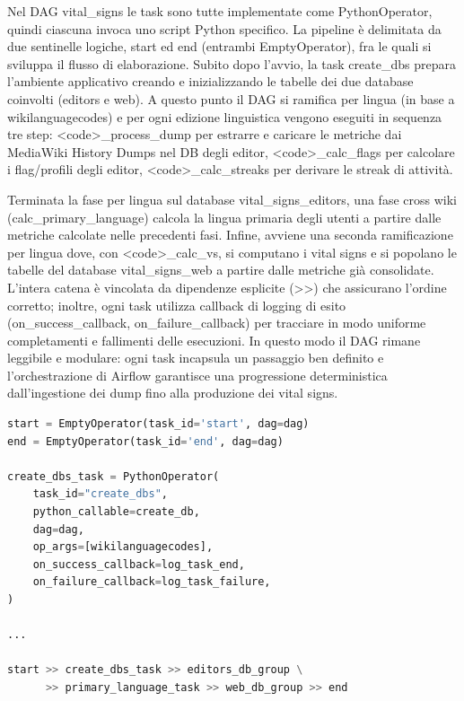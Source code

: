Nel DAG vital\_signs le task sono tutte implementate come PythonOperator,
quindi ciascuna invoca uno script Python specifico.
La pipeline è delimitata da due sentinelle logiche, start ed end (entrambi EmptyOperator), fra le quali si sviluppa il flusso di elaborazione.
Subito dopo l’avvio, la task create\_dbs prepara l’ambiente applicativo creando e inizializzando le tabelle dei due database coinvolti (editors e web).
A questo punto il DAG si ramifica per lingua (in base a wikilanguagecodes) e per ogni edizione linguistica vengono eseguiti in sequenza tre step:
\textless code\textgreater\_process\_dump per estrarre e caricare le metriche dai MediaWiki History Dumps nel DB degli editor,
\textless code\textgreater\_calc\_flags per calcolare i flag/profili degli editor,
\textless code\textgreater\_calc\_streaks per derivare le streak di attività.

Terminata la fase per lingua sul database vital\_signs\_editors, una fase cross wiki (calc\_primary\_language) calcola la lingua primaria degli utenti a partire dalle metriche calcolate nelle precedenti fasi.
Infine, avviene una seconda ramificazione per lingua dove, con \textless code\textgreater\_calc\_vs, si computano i vital signs e si popolano le tabelle del database  vital\_signs\_web a partire dalle metriche già consolidate.
L’intera catena è vincolata da dipendenze esplicite (\textgreater \textgreater) che assicurano l’ordine corretto; inoltre, ogni task utilizza callback di logging di esito (on\_success\_callback, on\_failure\_callback) per tracciare in modo uniforme completamenti e fallimenti delle esecuzioni.
In questo modo il DAG rimane leggibile e modulare: ogni task incapsula un passaggio ben definito e l’orchestrazione di Airflow garantisce una progressione deterministica dall’ingestione dei dump fino alla produzione dei vital signs.


\begin{lstlisting}[language=Python, caption={Esempio di definizione di una task e dipendenze del DAG}, label=lst:dag_tasks]
start = EmptyOperator(task_id='start', dag=dag)
end = EmptyOperator(task_id='end', dag=dag)

create_dbs_task = PythonOperator(
    task_id="create_dbs",
    python_callable=create_db,
    dag=dag,
    op_args=[wikilanguagecodes],
    on_success_callback=log_task_end,
    on_failure_callback=log_task_failure,
)

...

start >> create_dbs_task >> editors_db_group \
      >> primary_language_task >> web_db_group >> end
\end{lstlisting}

